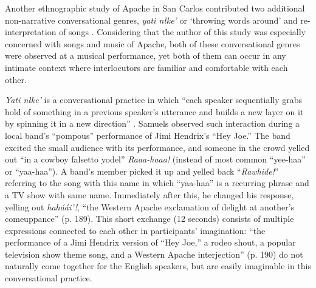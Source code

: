\documentclass[12pt]{article}
\begin{document}
Another ethnographic study of Apache in San Carlos contributed two additional non-narrative conversational genres, \textit{yati n\l ke'} or `throwing words around' and re-interpretation of songs \parencite{samuels2004}. Considering that the author of this study was especially concerned with songs and music of Apache, both of these conversational genres were observed at a musical performance, yet both of them can occur in any intimate context where interlocutors are familiar and comfortable with each other. 

\textit{Yati n\l ke'} is a conversational practice in which ``each speaker sequentially grabs hold of something in a previous speaker's utterance and builds a new layer on it by spinning it in a new direction'' \textcite[p. 190]{samuels2004}. Samuels observed such interaction during a local band's ``pompous'' performance of Jimi Hendrix's ``Hey Joe.'' The band excited the small audience with its performance, and someone in the crowd yelled out ``in a cowboy falsetto yodel'' \textit{Raaa-haaa!} (instead of most common ``yee-haa'' or ``yaa-haa''). A band's member picked it up and yelled back ``\textit{Rawhide!}'' referring to the song with this name in which ``yaa-haa'' is a recurring phrase and a TV show with same name. Immediately after this, he changed his response, yelling out \textit{hah\'a\'ai'!}, ``the Western Apache exclamation of delight at another's comeuppance'' (p. 189). This short exchange (12 seconds) consists of multiple expressions connected to each other in participants' imagination: ``the performance of a Jimi Hendrix version of ``Hey Joe,'' a rodeo shout, a popular television show theme song, and a Western Apache interjection'' (p. 190) do not naturally come together for the English speakers, but are easily imaginable in this conversational practice. 
\end{document}
